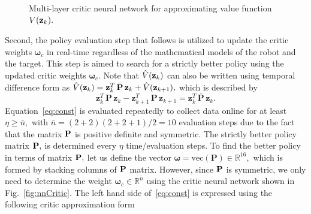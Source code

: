 \documentclass[conference]{IEEEtran}
\begin{document}
\begin{figure}
{\begin{adjustbox}{max width = 0.45\textwidth}
        \end{adjustbox}      
    }
    \caption{Multi-layer critic neural network for approximating value function $V({\bf z}_k).$}
    \label{fig:nnCritic}
      \end{figure}
      Second, the policy evaluation step that follows is utilized to update the critic weights $\bm{\omega}_c$ in real-time regardless of the mathematical models of the robot and the target. This step is aimed to search for a strictly better policy using the updated critic weights $\bm{\omega}_c.$ Note that $\hat V({\bf z}_k)$ can also be written using temporal difference form as $\hat V({\bf z}_k) = \mathbf{z}_k^T\, \bar{\mathbf{P}}\, \mathbf{z}_k + \hat V({\bf z}_{k+1}),$ which is described by
 \begin{equation}
 \label{eq:const}
 \mathbf{z}_k^T\, \mathbf{P}\, \mathbf{z}_k - \mathbf{z}_{k+1}^T\, \mathbf{P}\, \mathbf{z}_{k+1} = \mathbf{z}_k^T\, \bar{\mathbf{P}}\, \mathbf{z}_k. 
 \end{equation}
 Equation~\eqref{eq:const} is evaluated repeatedly to collect data online for at least $\eta\ge \bar n,$ with $\bar n= (2+2)(2+2+1)/2 = 10$ evaluation steps due to the fact that the matrix ${\bf P}$ is positive definite and symmetric. The strictly better policy matrix ${\bf P},$ is determined every $\eta$ time/evaluation steps. To find the better policy in terms of matrix ${\bf P},$ let us define the vector $\boldsymbol{\omega}=\mathrm{vec}(\mathbf{P})\in\mathbb{R}^{16},$ which is formed by stacking columns of ${\bf P}$ matrix.  However, since ${\bf P}$ is symmetric, we only need to determine the weight $\bm{\omega}_c\in\mathbb{R}^{\bar n}$ using the critic neural network shown in Fig.~\eqref{fig:nnCritic}. The left hand side of~\eqref{eq:const} is expressed using the following critic approximation form %
\end{document}
